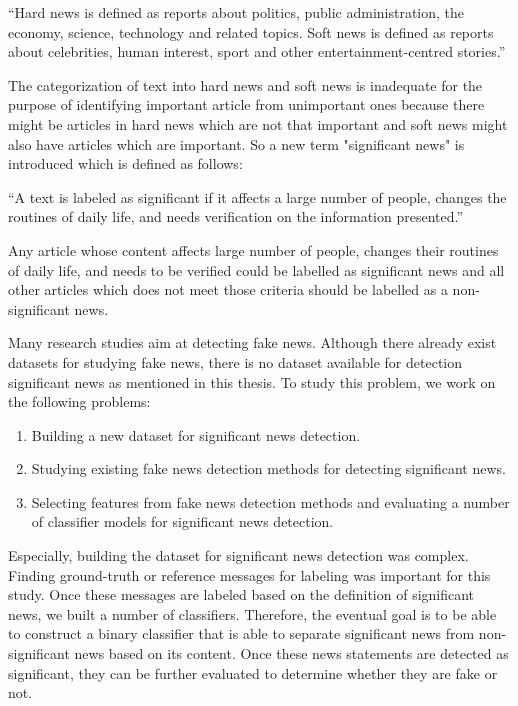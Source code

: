 \enquote{Hard news is defined as reports about politics, public administration, the economy, science, technology and related topics. Soft news is defined as reports about celebrities, human interest, sport and other entertainment-centred stories.}

The categorization of text into hard news and soft news is inadequate for the purpose of identifying important article from unimportant ones because there might be articles in hard news which are not that important and soft news might also have articles which are important. So a new term "significant news" is introduced which is defined as follows:

\enquote{A text is labeled as significant if it affects a large number of people, changes the routines of daily life, and needs verification on the information presented.}

Any article whose content affects large number of people, changes their routines of daily life, and needs to be verified could be labelled as significant news and all other articles which does not meet those criteria should be labelled as a non-significant news. 

Many research studies aim at detecting fake news. Although there already exist datasets for studying fake news, there is no dataset available for detection significant news as mentioned in this thesis. To study this problem, we work on the following problems:

\begin{enumerate}
    \item Building a new dataset for significant news detection.
    \item Studying existing fake news detection methods for detecting significant news.
    \item Selecting features from fake news detection methods and evaluating a number of classifier models for significant news detection.
\end{enumerate}

Especially, building the dataset for significant news detection was complex. Finding ground-truth or reference messages for labeling was important for this study. Once these messages are labeled based on the definition of significant news, we built a number of classifiers. Therefore, the eventual goal is to be able to construct a binary classifier that is able to separate significant news from non-significant news based on its content. Once these news statements are detected as significant, they can be further evaluated to determine whether they are fake or not.


